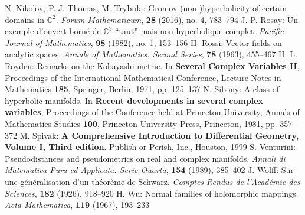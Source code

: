 \begin{thebibliography}{widest entry}
   N. Nikolov, P. J. Thomas, M. Trybuła: Gromov (non-)hyperbolicity of certain domains in $\mathbb{C}^2$. \textit{Forum Mathematicum}, \textbf{28} (2016), no. 4, 783--794
   J.-P. Rosay: Un exemple d'ouvert borné de $\mathbb{C}^3$ ``taut'' mais non hyperbolique complet. \textit{Pacific Journal of Mathematics}, \textbf{98} (1982), no. 1, 153--156
   H. Rossi: Vector fields on analytic spaces. \textit{Annals of Mathematics. Second Series}, \textbf{78} (1963), 455--467
   H. L. Royden: Remarks on the Kobayashi metric. In \textbf{Several Complex Variables II}, Proceedings of the International Mathematical Conference, Lecture Notes in Mathematics \textbf{185}, Springer, Berlin, 1971, pp. 125--137
   N. Sibony: A class of hyperbolic manifolds. In \textbf{ Recent developments in several complex variables}, Proceedings of the Conference held at Princeton University, Annals of Mathematics Studies \textbf{100}, Princeton University Press, Princeton, 1981, pp. 357--372
   M. Spivak: \textbf{A Comprehensive Introduction to Differential Geometry, Volume I, Third edition}. Publish or Perish, Inc., Houston, 1999
   S. Venturini: Pseudodistances and pseudometrics on real and complex manifolds. \textit{Annali di Matematica Pura ed Applicata. Serie Quarta}, \textbf{154} (1989), 385--402
   J. Wolff: Sur une généralisation d'un théorème de Schwarz. \textit{Comptes Rendus de l'Académie des Sciences}, \textbf{182} (1926), 918--920
   H. Wu: Normal families of holomorphic mappings. \textit{Acta Mathematica}, \textbf{119} (1967), 193--233
\end{thebibliography}
